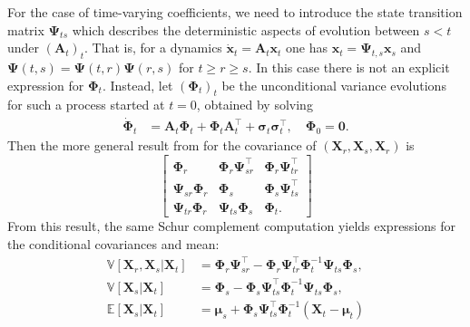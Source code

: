 \documentclass{article}
\newcommand{\E}{\mathbb{E}}
\newcommand{\V}{\mathbb{V}}
\theoremstyle{newstyle}
\begin{document}
  For the case of time-varying coefficients, we need to introduce the state transition matrix $\bm{\Psi}_{ts}$ \cite{lindquist1973feedback} which describes the deterministic aspects of evolution between $s < t$ under $(\bm{A}_t)_t$. That is, for a dynamics $\dot{\bm{x}}_t = \bm{A}_t \bm{x}_t$ one has $\bm{x}_t = \bm{\Psi}_{t, s} \bm{x}_s$ and $\bm{\Psi}(t, s) = \bm{\Psi}(t, r) \bm{\Psi}(r, s)$ for $t \geq r \geq s$. In this case there is not an explicit expression for $\bm{\Phi}_t$. Instead, let $(\bm{\Phi}_t)_t$ be the unconditional variance evolutions for such a process started at $t = 0$, obtained by solving
  \begin{align}
    \dot{\bm{\Phi}}_t &= \bm{A}_t \bm{\Phi}_t + \bm{\Phi}_t \bm{A}_t^\top + \bm{\sigma}_t \bm{\sigma}_t^\top, \quad \bm{\Phi}_0 = \bm{0}.  \label{eq:ode_covariance_timevarying}
  \end{align}
  Then the more general result from \cite{chen2015stochastic} for the covariance of $(\bm{X}_r, \bm{X}_s, \bm{X}_r)$ is 
  \begin{equation}
    \begin{bmatrix}
      \bm{\Phi}_r & \bm{\Phi}_r \bm{\Psi}_{sr}^\top & \bm{\Phi}_r \bm{\Psi}_{tr}^\top \\
      \bm{\Psi}_{sr} \bm{\Phi}_r & \bm{\Phi}_s & \bm{\Phi}_s \bm{\Psi}_{ts}^\top \\
      \bm{\Psi}_{tr} \bm{\Phi}_r & \bm{\Psi}_{ts} \bm{\Phi}_s & \bm{\Phi}_t. 
    \end{bmatrix}
  \end{equation}
  From this result, the same Schur complement computation yields expressions for the conditional covariances and mean: 
  \begin{align}
    \V[\bm{X}_r, \bm{X}_s | \bm{X}_t] &= \bm{\Phi}_r \bm{\Psi}_{sr}^\top - \bm{\Phi}_r \bm{\Psi}_{tr}^\top \bm{\Phi}_t^{-1} \bm{\Psi}_{ts} \bm{\Phi}_s, \\ 
    \V[\bm{X}_s | \bm{X}_t] &= \bm{\Phi}_s - \bm{\Phi}_s \bm{\Psi}_{ts}^\top \bm{\Phi}_t^{-1} \bm{\Psi}_{ts} \bm{\Phi}_s, \\
    \E[\bm{X}_s | \bm{X}_t] &= \bm{\mu}_s + \bm{\Phi}_s \bm{\Psi}_{ts}^\top \bm{\Phi}_t^{-1} (\bm{X}_t - \bm{\mu}_t)
  \end{align}


  
\end{document}
